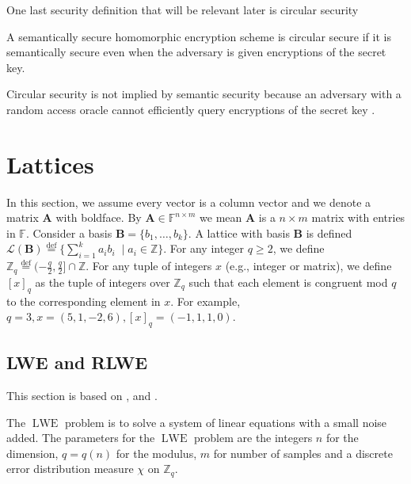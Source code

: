 \begin{definition}
    
\end{definition}


One last security definition that will be relevant later is circular security
\begin{definition}
    A semantically secure homomorphic encryption scheme is circular secure if it is semantically secure even when the adversary is given encryptions of the secret key.
\end{definition}
\begin{remark}
    Circular security is not implied by semantic security because an adversary with a random access oracle cannot efficiently query encryptions of the secret key \cite{Bra18-survey}.
\end{remark}

\section{Lattices}

In this section, we assume every vector is a column vector and we denote a matrix $\textbf{A}$ with boldface. By $\textbf{A} \in \mathbb{F}^{n \times m}$ we mean $\textbf{A}$ is a $n \times m$ matrix with entries in $\mathbb{F}$. Consider a basis $\textbf{B} = \{b_1, \dots, b_k\}$. A lattice with basis $\textbf{B}$ is defined $\mathcal{L}(\textbf{B}) \stackrel{\mathrm{def}}{=} \{ \sum_{i=1}^k a_i b_i \; \mid a_i \in \mathbb{Z}\}$. For any integer $q \geq 2$, we define $\mathbb{Z}_q \stackrel{\mathrm{def}}{=} (-\frac{q}{2}, \frac{q}{2}] \cap \mathbb{Z}$. For any tuple of integers $x$ (e.g., integer or matrix), we define $[x]_q$ as the tuple of integers over $\mathbb{Z}_q$ such that each element is congruent mod $q$ to the corresponding element in $x$. For example, $q = 3, x = (5,1,-2,6), [x]_q = (-1,1,1,0)$.

\subsection*{LWE and RLWE}\label{subsec:LWE}
This section is based on \cite{Hal18}, \cite{LNP22} and \cite{Pei16-decade}.

The $\operatorname{LWE}$ problem is to solve a system of linear equations with a small noise added.
The parameters for the $\operatorname{LWE}$ problem are the integers $n$ for the dimension, $q = q(n)$ for the modulus, $m$ for number of samples and a discrete error distribution measure $\chi$ on $\mathbb{Z}_q$.

